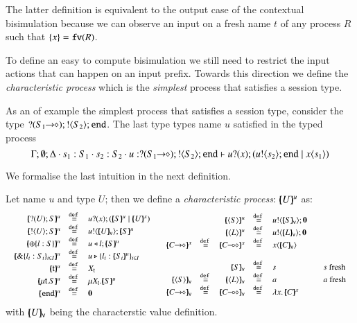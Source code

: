 The latter definition is equivalent to the output
case of the contextual bisimulation
because we can observe an input on a fresh name $t$
of any process $R$ such that $\{x\} = \mathtt{fv}(R)$.

To define an easy to compute bisimulation we still need to
restrict the input actions that can happen on an input
prefix.
Towards this direction we define the {\em characteristic
process} which is the {\em simplest} process that
satisfies a session type.

As an of example the simplest process that satisfies a
session type, consider the type
$? (S_1\!\! \rightarrow\!\! \diamond) ; ! \langle S_2 \rangle ; \mathtt{end}$. The last type
types name $u$ satisfied in the typed process
\[
	\Gamma; \emptyset; \Delta \cdot s_1: S_1 \cdot s_2: S_2 \cdot u: ? (S_1\!\! \rightarrow\!\! \diamond) ; ! \langle S_2 \rangle ; \mathtt{end} \vdash u ? (x) ; (u ! \langle s_2 \rangle ; \mathtt{end} \;|\; x\langle s_1 \rangle)
\]

We formalise the last intuition in the next definition.
%
\begin{definition}\rm
	\label{def:characteristic_process}
	\noi Let name $u$ and type $U$; then we define a {\em characteristic process}:
	$[\!\!(U)\!\!]^{u}$ as:
%
	\[
	\begin{array}{cc}
		\begin{array}{rclcl}
			\mapchar{\btinp{U} S}{u} &\defeq& \binp{u}{x} (\mapchar{S}{u} \Par \mapchar{U}{x})
			\\
			\mapchar{\btout{U} S}{u} &\defeq& \bout{u}{\omapchar{U}} \mapchar{S}{u} %
			\\
			\mapchar{\btsel{l : S}}{u} &\defeq& \bsel{u}{l} \mapchar{S}{u}
			\\
			\mapchar{\btbra{l_i: S_i}_{i \in I}}{u} &\defeq& \bbra{u}{l_i: \mapchar{S_i}{u}}_{i \in I}
			\\
			\mapchar{\tvar{t}}{u} &\defeq& \varp{X}_{\vart{t}}
			\\
			\mapchar{\trec{t}{S}}{u} &\defeq& \recp{X_{\vart{t}}}{\mapchar{S}{u}}
			\\
			\mapchar{\tinact}{u} &\defeq& \inact
			\\
		\end{array}
		&
		\begin{array}{rcrclcl}
			&&\mapchar{\chtype{S}}{u} &\defeq& \bout{u}{\omapchar{S}} \inact
			\\
			&&\mapchar{\chtype{L}}{u} &\defeq& \bout{u}{\omapchar{L}} \inact
			\\
			\mapchar{\shot{C}}{x} &\defeq& \mapchar{\lhot{C}}{x} &\defeq& \appl{x}{\omapchar{C}}
			\\
			\\
			&&\omapchar{S} &\defeq& s && s \textrm{ fresh}
			\\
			\omapchar{\chtype{S}} &\defeq& \omapchar{\chtype{L}} &\defeq& a && a \textrm{ fresh}
			\\
			\omapchar{\shot{C}} &\defeq& \omapchar{\lhot{C}} &\defeq& \abs{x}{\mapchar{C}{x}}
		\end{array}
	\end{array}
	\]
	\noi with $[\!\!(U)\!\!]_{\mathsf{v}}$ being the characterstic value definition.
\end{definition}

